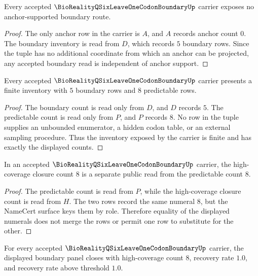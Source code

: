 \begin{lemma}
\label{lem:bioreality-q-six-leave-one-codon-boundary-anchor-exclusion}
Every accepted $\BioRealityQSixLeaveOneCodonBoundaryUp$ carrier exposes no anchor-supported boundary route.
\end{lemma}

\begin{proof}
The only anchor row in the carrier is $A$, and $A$ records anchor count $0$. The boundary inventory is read from $D$, which records $5$ boundary rows. Since the tuple has no additional coordinate from which an anchor can be projected, any accepted boundary read is independent of anchor support.
\end{proof}

\begin{lemma}
\label{lem:bioreality-q-six-leave-one-codon-boundary-finite-inventory}
Every accepted $\BioRealityQSixLeaveOneCodonBoundaryUp$ carrier presents a finite inventory with $5$ boundary rows and $8$ predictable rows.
\end{lemma}

\begin{proof}
The boundary count is read only from $D$, and $D$ records $5$. The predictable count is read only from $P$, and $P$ records $8$. No row in the tuple supplies an unbounded enumerator, a hidden codon table, or an external sampling procedure. Thus the inventory exposed by the carrier is finite and has exactly the displayed counts.
\end{proof}

\begin{lemma}
\label{lem:bioreality-q-six-leave-one-codon-boundary-coverage-separated}
In an accepted $\BioRealityQSixLeaveOneCodonBoundaryUp$ carrier, the high-coverage closure count $8$ is a separate public read from the predictable count $8$.
\end{lemma}

\begin{proof}
The predictable count is read from $P$, while the high-coverage closure count is read from $H$. The two rows record the same numeral $8$, but the NameCert surface keys them by role. Therefore equality of the displayed numerals does not merge the rows or permit one row to substitute for the other.
\end{proof}

\begin{theorem}
\label{thm:bioreality-q-six-leave-one-codon-boundary-recovery-certificate}
For every accepted $\BioRealityQSixLeaveOneCodonBoundaryUp$ carrier, the displayed boundary panel closes with high-coverage count $8$, recovery rate $1.0$, and recovery rate above threshold $1.0$.
\end{theorem}

